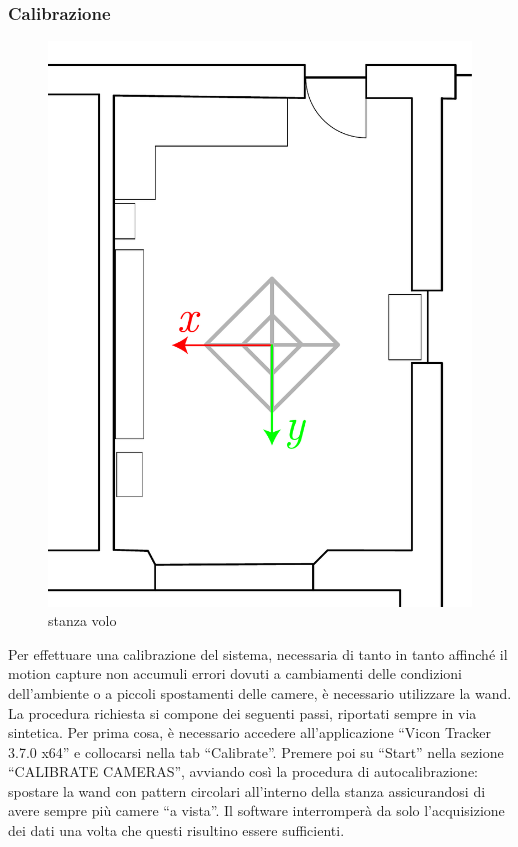 \subsubsection{Calibrazione}

\begin{figure}[] 
	\centering    
	\includegraphics[height=.4\textheight]{stanza_volo.pdf}
	\caption{stanza volo}
	\label{fig: stanza volo Vicon frame}
\end{figure}

Per effettuare una calibrazione del sistema, necessaria di tanto in tanto affinché il motion capture non accumuli errori dovuti a cambiamenti delle condizioni dell'ambiente o a piccoli spostamenti delle camere, è necessario utilizzare la wand. 
La procedura richiesta si compone dei seguenti passi, riportati sempre in via sintetica. 
Per prima cosa, è necessario accedere all'applicazione ``Vicon Tracker 3.7.0 x64'' e collocarsi nella tab ``Calibrate''. 
Premere poi su ``Start'' nella sezione ``CALIBRATE CAMERAS'', avviando così la procedura di autocalibrazione: spostare la wand con pattern circolari all'interno della stanza assicurandosi di avere sempre più camere ``a vista''. 
Il software interromperà da solo l'acquisizione dei dati una volta che questi risultino essere sufficienti.

